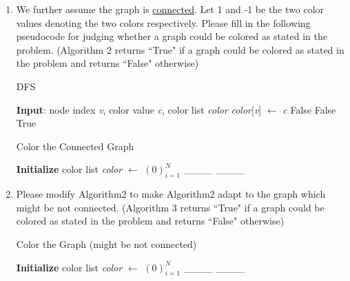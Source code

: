\documentclass{article}
\begin{document}
\begin{enumerate}
\begin{enumerate}
        \item We further assume the graph is \href{https://en.wikipedia.org/wiki/Connectivity_(graph_theory)}{connected}. 
        Let 1 and -1 be the two color values denoting the two colors respectively.
        Please fill in the following pseudocode for judging whether a graph could be colored as stated in the problem.  (Algorithm 2 returns ``True" if a graph could be colored as stated in the problem and returns ``False" otherwise)
\begin{algorithm}[h]
\caption{DFS}
\begin{algorithmic}[1]
\STATE\textbf{Input}: node index \textit{v}, color value \textit{c}, color list \textit{color}
\STATE \textit{color}[\textit{v}] $\gets$ \textit{c}
        \RETURN False
    \ENDIF
        \RETURN False
    \ENDIF
\ENDFOR
\RETURN True
\end{algorithmic}
\end{algorithm}
\begin{algorithm}[h]
\caption{Color the Connected Graph}
\begin{algorithmic}[1]
\STATE\textbf{Initialize} color list \textit{color} $\gets$ $(0)^N_{i=1}$
        \RETURN \_\_\_\_
    \ENDIF
\RETURN \_\_\_\_
\end{algorithmic}
\end{algorithm}

    \item 
Please modify Algorithm2 to make Algorithm2 adapt to the graph which might be not connected. (Algorithm 3 returns ``True" if a graph could be colored as stated in the problem and returns ``False" otherwise)
\begin{algorithm}[h]
\caption{Color the Graph (might be not connected)}
\begin{algorithmic}[1]
\STATE\textbf{Initialize} color list \textit{color} $\gets$ $(0)^N_{i=1}$
        \RETURN \_\_\_\_
    \ENDIF
\ENDIF
\ENDFOR
\RETURN \_\_\_\_
\end{algorithmic}
\end{algorithm}
    \end{enumerate}
    

\end{enumerate}
\end{document}

